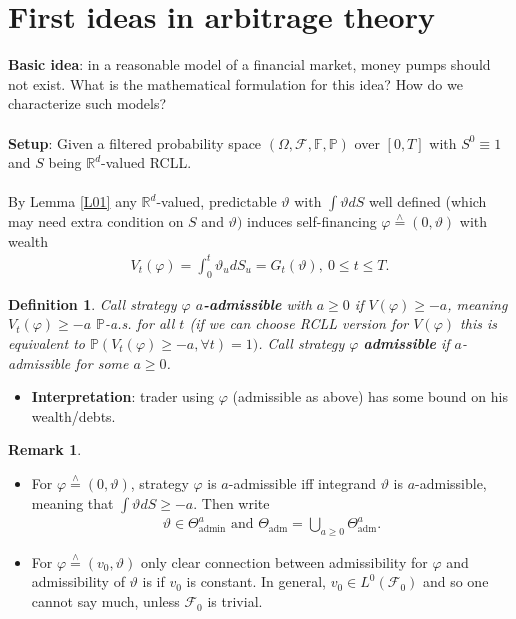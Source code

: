 \documentclass[12pt,a4paper, twoside]{article}
\newtheorem{defn}{Definition}[section]
\theoremstyle{definition}
\newtheorem{rem}{Remark}[section]
\newcommand{\PP}{\mathbb{P}} %
\newcommand{\teq}{\overset{\wedge}{=}}
\begin{document}
\section{First ideas in arbitrage theory}
\textbf{Basic idea}: in a reasonable model of a financial market, money pumps should not exist. What is the mathematical formulation for this idea? How do we characterize such models?\\
\\
\textbf{Setup}: Given a filtered probability space $( \Omega, \mathcal{F}, \mathbb{F}, \PP)$ over $[0,T]$ with $S^0 \equiv 1$ and $S$ being $\mathbb{R}^d$-valued RCLL. 
\\\\
By Lemma \ref{L01} any $\mathbb{R}^d$-valued, predictable $\vartheta$ with $\int \vartheta dS$ well defined (which may need extra condition on $S$ and $\vartheta)$ induces self-financing $\varphi \teq (0, \vartheta)$ with wealth 
\begin{align*}
V_t( \varphi) = \int_0^t \vartheta_u dS_u = G_t( \vartheta), \ 0 \leq t \leq T.
\end{align*}
\begin{defn} Call strategy $\varphi$ \textbf{$a$-admissible} with $a \geq 0$ if $V( \varphi) \geq -a$, meaning $V_t( \varphi) \geq - a$ $\PP$-a.s. for all $t$ (if we can choose RCLL version for $V(\varphi)$ this is equivalent to $\mathbb{P}( V_t( \varphi) \geq - a, \forall t)=1)$. Call strategy $\varphi$ \textbf{admissible} if $a$-admissible for some $a \geq 0$. 
\end{defn}
\begin{itemize}
\item \textbf{Interpretation}: trader using $\varphi$ (admissible as above) has some bound on his wealth/debts. 
\end{itemize}
\begin{rem} \
\begin{itemize}
\item For $\varphi \teq (0, \vartheta)$, strategy $\varphi$ is $a$-admissible iff integrand $\vartheta$ is $a$-admissible, meaning that $\int \vartheta dS \geq -a$. Then write 
\begin{align*}
\vartheta \in \Theta_{\text{admin}}^a \text{ and } \Theta_{\text{adm}} = \bigcup_{a \geq 0 } \Theta_{\text{adm}}^a.
\end{align*}
\item For $\varphi \teq (v_0, \vartheta)$ only clear connection between admissibility for $\varphi$ and admissibility of $\vartheta$ is if $v_0$ is constant. In general, $v_0 \in L^0( \mathcal{F}_0)$ and so one cannot say much, unless $\mathcal{F}_0$ is trivial. 
\end{itemize} 
\end{rem}
\end{document}
